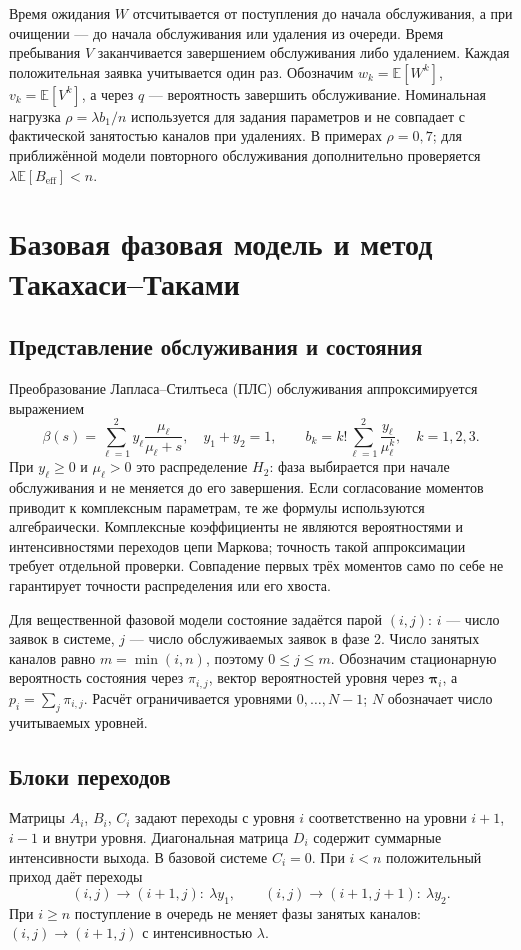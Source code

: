Время ожидания \(W\) отсчитывается от поступления до начала обслуживания, а при очищении --- до начала обслуживания или удаления из очереди. Время пребывания \(V\) заканчивается завершением обслуживания либо удалением. Каждая положительная заявка учитывается один раз. Обозначим \(w_k=\mathbb E[W^k]\), \(v_k=\mathbb E[V^k]\), а через \(q\) --- вероятность завершить обслуживание. Номинальная нагрузка \(\rho=\lambda b_1/n\) используется для задания параметров и не совпадает с фактической занятостью каналов при удалениях. В примерах \(\rho=0{,}7\); для приближённой модели повторного обслуживания дополнительно проверяется \(\lambda\mathbb E[B_{\mathrm{eff}}]<n\).

\section{Базовая фазовая модель и метод Такахаси--Таками}
\subsection{Представление обслуживания и состояния}
Преобразование Лапласа--Стилтьеса (ПЛС) обслуживания аппроксимируется выражением
\[
\beta(s)=\sum_{\ell=1}^{2}y_\ell\frac{\mu_\ell}{\mu_\ell+s},\quad
y_1+y_2=1,\qquad
b_k=k!\sum_{\ell=1}^{2}\frac{y_\ell}{\mu_\ell^k},\quad k=1,2,3.
\]
При \(y_\ell\ge0\) и \(\mu_\ell>0\) это распределение \(H_2\): фаза выбирается при начале обслуживания и не меняется до его завершения. Если согласование моментов приводит к комплексным параметрам, те же формулы используются алгебраически. Комплексные коэффициенты не являются вероятностями и интенсивностями переходов цепи Маркова; точность такой аппроксимации требует отдельной проверки. Совпадение первых трёх моментов само по себе не гарантирует точности распределения или его хвоста.

Для вещественной фазовой модели состояние задаётся парой \((i,j)\): \(i\) --- число заявок в системе, \(j\) --- число обслуживаемых заявок в фазе 2. Число занятых каналов равно \(m=\min(i,n)\), поэтому \(0\le j\le m\). Обозначим стационарную вероятность состояния через \(\pi_{i,j}\), вектор вероятностей уровня через \(\boldsymbol\pi_i\), а \(p_i=\sum_j\pi_{i,j}\). Расчёт ограничивается уровнями \(0,\ldots,N-1\); \(N\) обозначает число учитываемых уровней.

\subsection{Блоки переходов}
Матрицы \(A_i\), \(B_i\), \(C_i\) задают переходы с уровня \(i\) соответственно на уровни \(i+1\), \(i-1\) и внутри уровня. Диагональная матрица \(D_i\) содержит суммарные интенсивности выхода. В базовой системе \(C_i=0\). При \(i<n\) положительный приход даёт переходы
\[
(i,j)\to(i+1,j):\ \lambda y_1,\qquad
(i,j)\to(i+1,j+1):\ \lambda y_2.
\]
При \(i\ge n\) поступление в очередь не меняет фазы занятых каналов: \((i,j)\to(i+1,j)\) с интенсивностью \(\lambda\).


